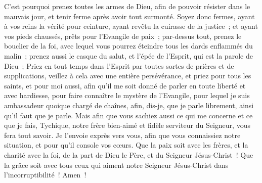 \begin{multicols}{2}
C'est pourquoi prenez toutes les armes de Dieu, afin de pouvoir résister dans le mauvais jour, et tenir ferme après avoir tout surmonté.
Soyez donc fermes, ayant à vos reins la vérité pour ceinture, ayant revêtu la cuirasse de la justice~;
et ayant vos pieds chaussés, prêts pour l'Evangile de paix~;
par-dessus tout, prenez le bouclier de la foi, avec lequel vous pourrez éteindre tous les dards enflammés du malin~;
prenez aussi le casque du salut, et l'épée de l'Esprit, qui est la parole de Dieu~;
Priez en tout temps dans l'Esprit par toutes sortes de prières et de supplications, veillez à cela avec une entière persévérance, et priez pour tous les saints,
et pour moi aussi, afin qu'il me soit donné de parler en toute liberté et avec hardiesse, pour faire connaître le mystère de l'Evangile,
pour lequel je suis ambassadeur quoique chargé de chaînes, afin, dis-je, que je parle librement, ainsi qu'il faut que je parle.
Mais afin que vous sachiez aussi ce qui me concerne et ce que je fais, Tychique, notre frère bien-aimé et fidèle serviteur du Seigneur, vous fera tout savoir.
Je l'envoie exprès vers vous, afin que vous connaissiez notre situation, et pour qu'il console vos cœurs.
Que la paix soit avec les frères, et la charité avec la foi, de la part de Dieu le Père, et du Seigneur Jésus-Christ~!
Que la grâce soit avec tous ceux qui aiment notre Seigneur Jésus-Christ dans l'incorruptibilité~! Amen~!
\PPE{}
\end{multicols}
